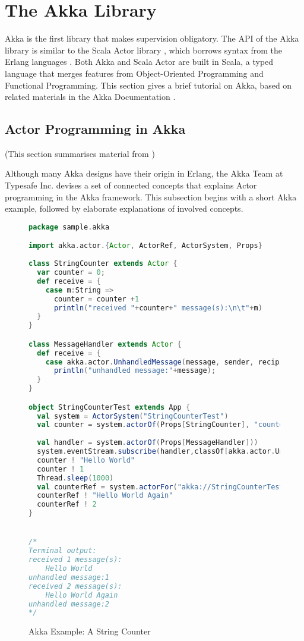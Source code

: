 \section{The Akka Library}
\label{akka_lib}
Akka is the first library that makes supervision obligatory. The API of the 
Akka library \citep{akka_api, akka_doc} is similar to the Scala 
Actor library \citep{actor_1, actor_2}, which borrows syntax from the Erlang 
languages \citep{ArmstrongErlang, ErlangManual}.  Both Akka and Scala Actor are 
built in Scala, a typed language that merges features from Object-Oriented 
Programming and Functional Programming.  This section gives a brief tutorial 
on Akka, based on related materials in the Akka Documentation 
\citep{akka_doc}.


\subsection{Actor Programming in Akka}
\label{subsection:actor_akka}

(This section summarises material from \citep[Section 2.3 and 3.1]{akka_doc})
\vspace{12 pt}

Although many Akka designs have their origin in Erlang, the Akka Team at 
Typesafe Inc. devises a set of connected concepts that explains Actor 
programming in the Akka framework.  This subsection begins with a short Akka 
example, followed by elaborate explanations of involved concepts.



\begin{figure}[p]
      \begin{lstlisting}[language=scala]
package sample.akka

import akka.actor.{Actor, ActorRef, ActorSystem, Props}
      
class StringCounter extends Actor {
  var counter = 0;
  def receive = {
    case m:String => 
      counter = counter +1
      println("received "+counter+" message(s):\n\t"+m)
  }
}

class MessageHandler extends Actor {
  def receive = {
    case akka.actor.UnhandledMessage(message, sender, recipient) =>
      println("unhandled message:"+message);
  }
}

object StringCounterTest extends App {
  val system = ActorSystem("StringCounterTest")
  val counter = system.actorOf(Props[StringCounter], "counter")
  
  val handler = system.actorOf(Props[MessageHandler]))
  system.eventStream.subscribe(handler,classOf[akka.actor.UnhandledMessage]);
  counter ! "Hello World"
  counter ! 1
  Thread.sleep(1000)
  val counterRef = system.actorFor("akka://StringCounterTest/user/counter")
  counterRef ! "Hello World Again"
  counterRef ! 2
}


/*
Terminal output:
received 1 message(s):
	Hello World
unhandled message:1	
received 2 message(s):
	Hello World Again
unhandled message:2
*/
    \end{lstlisting}
    \caption{Akka Example: A String Counter}
 \label{fig:akka_string_counter}    
\end{figure}

